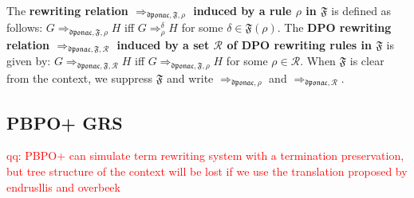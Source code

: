 \begin{definition}
  The \textbf{rewriting relation $\mathop{\Rightarrow}_{\mathfrak{dponac},\mathfrak{F},\rho}$ induced by a rule $\rho$ in $\mathfrak{F}$} is defined as follows: $G \mathop{\Rightarrow}_{\mathfrak{dponac},\mathfrak{F},\rho} H$ iff $G \mathop{\Rightarrow}_\rho^\delta H$ for some $\delta \mathop{\in} \mathfrak{F}(\rho)$. 
     The \textbf{DPO rewriting relation $\mathop{\Rightarrow}_{\mathfrak{dponac},\mathfrak{F},\mathcal{R}}$ induced by a set $\mathcal{R}$ of DPO rewriting rules in $\mathfrak{F}$} is given by: $G \mathop{\Rightarrow}_{\mathfrak{dponac}, \mathfrak{F},\mathcal{R}} H$ iff $G \mathop{\Rightarrow}_{\mathfrak{dponac},\mathfrak{F}, \rho} H$ for some $\rho \mathop{\in} \mathcal{R}$. When $\mathfrak{F}$ is clear from the context, we 
    suppress $\mathfrak{F}$ and 
    write $\mathop{\Rightarrow}_{\mathfrak{dponac},\rho}$ and $\mathop{\Rightarrow}_{\mathfrak{dponac},\mathcal{R}}$.
\end{definition}

\subsection{PBPO+ GRS}
\textcolor{red}{qq: PBPO+ can simulate term rewriting system with a termination preservation, but tree structure of the context will be lost if we use the translation proposed by endrusllis and overbeek}


